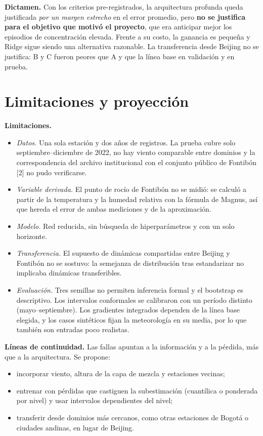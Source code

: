 \documentclass[11pt,letterpaper]{article}
\begin{document}
\textbf{Dictamen.} Con los criterios pre-registrados, la arquitectura profunda queda justificada
\emph{por un margen estrecho} en el error promedio, pero \textbf{no se justifica para el objetivo que
motivó el proyecto}, que era anticipar mejor los episodios de concentración elevada. Frente a su costo, la
ganancia es pequeña y Ridge sigue siendo una alternativa razonable. La transferencia desde Beijing no se
justifica: B y C fueron peores que A y que la línea base en validación y en prueba.

\section{Limitaciones y proyección}

\textbf{Limitaciones.}
\begin{itemize}
\item \emph{Datos.} Una sola estación y dos años de registros. La prueba cubre solo septiembre–diciembre
  de 2022, no hay viento comparable entre dominios y la correspondencia del archivo institucional con el
  conjunto público de Fontibón [2] no pudo verificarse.
\item \emph{Variable derivada.} El punto de rocío de Fontibón no se midió: se calculó a partir de la
  temperatura y la humedad relativa con la fórmula de Magnus, así que hereda el error de ambas mediciones y
  de la aproximación.
\item \emph{Modelo.} Red reducida, sin búsqueda de hiperparámetros y con un solo horizonte.
\item \emph{Transferencia.} El supuesto de dinámicas compartidas entre Beijing y Fontibón no se sostuvo:
  la semejanza de distribución tras estandarizar no implicaba dinámicas transferibles.
\item \emph{Evaluación.} Tres semillas no permiten inferencia formal y el bootstrap es descriptivo. Los
  intervalos conformales se calibraron con un período distinto (mayo–septiembre). Los gradientes
  integrados dependen de la línea base elegida, y los casos sintéticos fijan la meteorología en su media,
  por lo que también son entradas poco realistas.
\end{itemize}

\textbf{Líneas de continuidad.} Las fallas apuntan a la información y a la pérdida, más que a la
arquitectura. Se propone:
\begin{itemize}
\item incorporar viento, altura de la capa de mezcla y estaciones vecinas;
\item entrenar con pérdidas que castiguen la subestimación (cuantílica o ponderada por nivel) y usar
  intervalos dependientes del nivel;
\item transferir desde dominios más cercanos, como otras estaciones de Bogotá o ciudades andinas, en lugar
  de Beijing.
\end{itemize}
\end{document}
